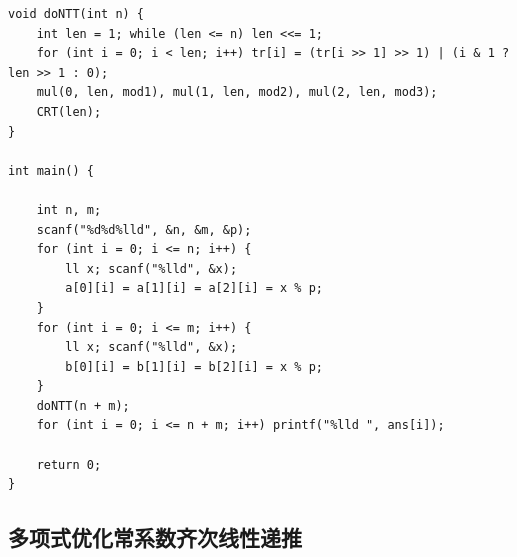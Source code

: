 \documentclass[twoside]{article}
\begin{document}
\begin{lstlisting}
void doNTT(int n) {
    int len = 1; while (len <= n) len <<= 1;
    for (int i = 0; i < len; i++) tr[i] = (tr[i >> 1] >> 1) | (i & 1 ? len >> 1 : 0);
    mul(0, len, mod1), mul(1, len, mod2), mul(2, len, mod3);
    CRT(len);
}

int main() {

    int n, m;
    scanf("%d%d%lld", &n, &m, &p);
    for (int i = 0; i <= n; i++) {
        ll x; scanf("%lld", &x);
        a[0][i] = a[1][i] = a[2][i] = x % p;
    }
    for (int i = 0; i <= m; i++) {
        ll x; scanf("%lld", &x);
        b[0][i] = b[1][i] = b[2][i] = x % p;
    }
    doNTT(n + m);
    for (int i = 0; i <= n + m; i++) printf("%lld ", ans[i]);

    return 0;
}\end{lstlisting}
\subsection{多项式优化常系数齐次线性递推}
\end{document}
